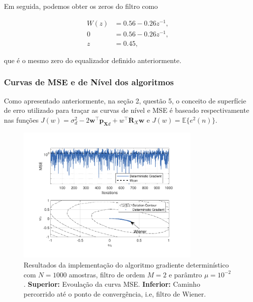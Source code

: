 Em seguida, podemos obter os zeros do filtro como

\begin{align}
    W(z) &= 0.56 - 0.26 z^{-1}, \\
    0 &= 0.56 - 0.26 z^{-1}, \\
    z &= 0.45,
\end{align}

que é o mesmo zero do equalizador definido anteriormente.


\subsubsection{Curvas de MSE e de Nível dos algoritmos}
Como apresentado anteriormente, na seção 2, questão 5, o conceito de superfície de erro utilizado para traçar as curvas de nível e MSE é baseado respectivamente nas funções $J(w) = \sigma^{2}_{d} - 2\mathbf{w}^{\top}\mathbf{p}_{\mathbf{X} d} + w^{\top}\mathbf{R}_{X}\mathbf{w} $ e $J(w) = \mathbb{E}\{e^{2}(n)\}$.

\begin{figure}[!htp]
    \centering
    \includegraphics[width=0.80\textwidth]{fig/hw3p4-dga.pdf}
    \caption{Resultados da implementação do algoritmo gradiente determinístico com $N = 1000$ amostras, filtro de ordem $M = 2$ e parâmtro $\mu = 10^{-2}$. \textbf{Superior:} Evoulação da curva MSE. \textbf{Inferior:} Caminho percorrido até o ponto de convergência, i.e, filtro de Wiener.}
    \label{fig:hw3p4-dga}
\end{figure}

